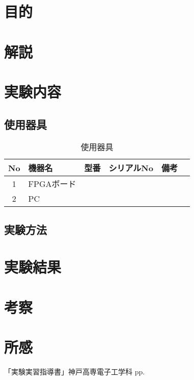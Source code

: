 \documentclass[11pt]{ltjsarticle}
\title{}
\begin{document}
\maketitle

\section{目的}
	
\section{解説}
	\subsection{}
\section{実験内容}
	\subsection{使用器具}
		\begin{table}[H]
		\begin{center}
		\caption{使用器具}
		\label{tab:used}
		\begin{tabular}{clllll} \toprule
		No&\multicolumn{1}{l}{機器名}&\multicolumn{1}{l}{型番}&\multicolumn{1}{l}{シリアルNo}&\multicolumn{1}{l}{備考}\\ \hline
		1&FPGAボード&&&\\
		2&PC&&&\\
		\bottomrule
		\end{tabular}
		\end{center}
		\end{table}
	\subsection{実験方法}
\section{実験結果}
\section{考察}
\section{所感}
\begin{thebibliography}{99}
「実験実習指導書」神戸高専電子工学科 pp.
\end{thebibliography}
\end{document}
